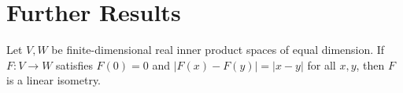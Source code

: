 \section{Further Results}

\begin{proposition}\label{prop:distance-preserving-map-linear-isometry}
\leanok
Let $V,W$ be finite-dimensional real inner product spaces of equal dimension.
If $F:V\to W$ satisfies $F(0)=0$ and
$|F(x)-F(y)|=|x-y|$ for all $x,y$, then $F$ is a linear isometry.
\end{proposition}

